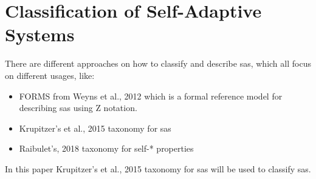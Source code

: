 \newpage
\section{Classification of Self-Adaptive Systems}
\label{ch:SASClassification}




There are different approaches on how to classify and describe \acrlong{sas},
which all focus on different usages, like:
\begin{itemize}
    \item FORMS from Weyns et al., 2012\cite*{FORMS} which is a formal reference model for describing \acrlong{sas} using Z notation.
    \item Krupitzer's et al., 2015\cite*{SurveyOnEngineeringApproaches} taxonomy for \acrlong{sas}
    \item Raibulet's, 2018\cite*{TaxonomyOfSelfSoftware} taxonomy for self-* properties
\end{itemize} 
In this paper Krupitzer's et al., 2015\cite*{SurveyOnEngineeringApproaches} taxonomy for \acrlong{sas} will be used to classify \acrshort{sas}.

